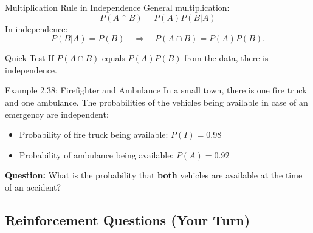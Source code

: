 \documentclass[light]{lutbeamer}
\begin{document}
\begin{frame}[fragile]{Multiplication Rule in Independence}
    General multiplication:
    \[
    P(A\cap B)=P(A)P(B|A)
    \]
    In independence:
    \[
    P(B|A)=P(B)\quad \Rightarrow\quad P(A\cap B)=P(A)P(B).
    \]

    \begin{block}{Quick Test}
        If \(P(A\cap B)\) equals \(P(A)P(B)\) from the data, there is independence.
    \end{block}
\end{frame}

\begin{frame}{Example 2.38: Firefighter and Ambulance}
    \small
    In a small town, there is one fire truck and one ambulance. The probabilities of the vehicles being available in case of an emergency are independent:
    \begin{itemize}
        \item Probability of fire truck being available: $P(I) = 0.98$
        \item Probability of ambulance being available: $P(A) = 0.92$
    \end{itemize}


    \vspace{0.2cm}
    \textbf{Question:} What is the probability that \textbf{both} vehicles are available at the time of an accident?

\end{frame}

\subsection{Reinforcement Questions (Your Turn)}
\end{document}
